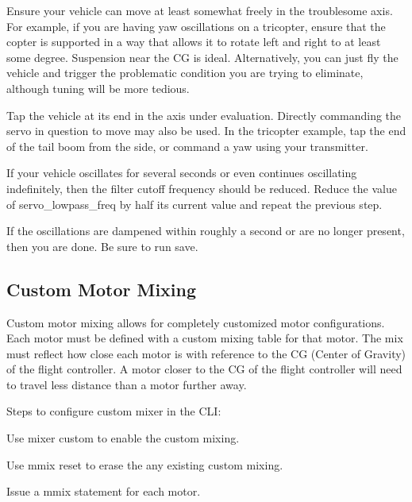 \begin{DoxyEnumerate}
\item Ensure your vehicle can move at least somewhat freely in the troublesome axis. For example, if you are having yaw oscillations on a tricopter, ensure that the copter is supported in a way that allows it to rotate left and right to at least some degree. Suspension near the C\+G is ideal. Alternatively, you can just fly the vehicle and trigger the problematic condition you are trying to eliminate, although tuning will be more tedious.
\item Tap the vehicle at its end in the axis under evaluation. Directly commanding the servo in question to move may also be used. In the tricopter example, tap the end of the tail boom from the side, or command a yaw using your transmitter.
\item If your vehicle oscillates for several seconds or even continues oscillating indefinitely, then the filter cutoff frequency should be reduced. Reduce the value of {\ttfamily servo\+\_\+lowpass\+\_\+freq} by half its current value and repeat the previous step.
\item If the oscillations are dampened within roughly a second or are no longer present, then you are done. Be sure to run {\ttfamily save}.
\end{DoxyEnumerate}

\subsection*{Custom Motor Mixing}

Custom motor mixing allows for completely customized motor configurations. Each motor must be defined with a custom mixing table for that motor. The mix must reflect how close each motor is with reference to the C\+G (Center of Gravity) of the flight controller. A motor closer to the C\+G of the flight controller will need to travel less distance than a motor further away.

Steps to configure custom mixer in the C\+L\+I\+:


\begin{DoxyEnumerate}
\item Use {\ttfamily mixer custom} to enable the custom mixing.
\item Use {\ttfamily mmix reset} to erase the any existing custom mixing.
\item Issue a {\ttfamily mmix} statement for each motor.
\end{DoxyEnumerate}

